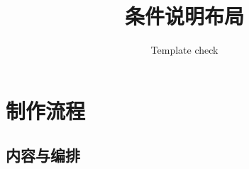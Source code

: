 \documentclass[language=chinese]{campusbeamer}
\title{条件说明布局}
\author{Template check}
\begin{document}
\section{制作流程}
\subsection{内容与编排}

\end{document}

